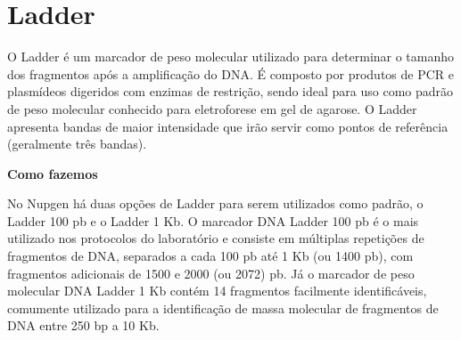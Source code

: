 \documentclass[
  letterpaper,
  DIV=11,
  numbers=noendperiod]{scrreprt}
\begin{document}
\hypertarget{ladder}{%
\section{Ladder}\label{ladder}}

O Ladder é um marcador de peso molecular utilizado para determinar o
tamanho dos fragmentos após a amplificação do DNA. É composto por
produtos de PCR e plasmídeos digeridos com enzimas de restrição, sendo
ideal para uso como padrão de peso molecular conhecido para eletroforese
em gel de agarose. O Ladder apresenta bandas de maior intensidade que
irão servir como pontos de referência (geralmente três bandas).

\begin{tcolorbox}[enhanced jigsaw, colback=white, toprule=.15mm, rightrule=.15mm, opacityback=0, left=2mm, arc=.35mm, bottomrule=.15mm, breakable, leftrule=.75mm]
\begin{minipage}[t]{5.5mm}
\textcolor{quarto-callout-note-color}{\faInfo}
\end{minipage}%
\begin{minipage}[t]{\textwidth - 5.5mm}

\textbf{Como fazemos}\vspace{2mm}

No Nupgen há duas opções de Ladder para serem utilizados como padrão, o
Ladder 100 pb e o Ladder 1 Kb. O marcador DNA Ladder 100 pb é o mais
utilizado nos protocolos do laboratório e consiste em múltiplas
repetições de fragmentos de DNA, separados a cada 100 pb até 1 Kb (ou
1400 pb), com fragmentos adicionais de 1500 e 2000 (ou 2072) pb. Já o
marcador de peso molecular DNA Ladder 1 Kb contém 14 fragmentos
facilmente identificáveis, comumente utilizado para a identificação de
massa molecular de fragmentos de DNA entre 250 bp a 10 Kb.

\end{minipage}%
\end{tcolorbox}
\end{document}

